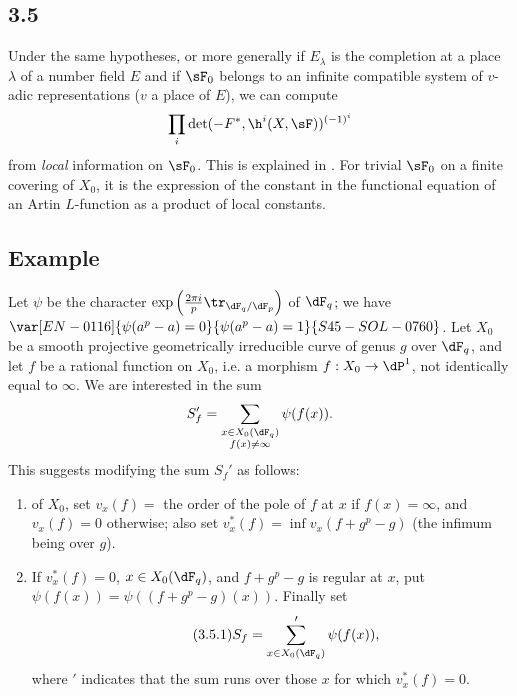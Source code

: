 \subsection*{3.5}\label{VI:3-5_} %

Under the same hypotheses, or more generally if $E_\lambda$ is the 
completion at a place $\lambda$ of a number field $E$ and if $\sF_0$ 
belongs to an infinite compatible system of $v$-adic representations 
($v$ a place of $E$), we can compute 
\[
  \prod_i \det(-F^\ast,\h^i(X,\sF))^{(-1)^i} 
\]
from \emph{local} information on $\sF_0$. This is explained in 
. For trivial $\sF_0$ on a finite covering of $X_0$, it is 
the expression of the constant in the functional equation of an Artin 
$L$-function as a product of local constants. 





\subsection{Example}\label{VI:3-5}

Let $\psi$ be the character 
$\exp\left(\frac{2\pi i}{p} \tr_{\dF_q/\dF_p}\right)$ of $\dF_q$; we have 
$\var[EN-0116]{\psi(a^p-a)=0}{\psi(a^p-a)=1}{S45-SOL-0760}$. Let $X_0$ be a smooth projective geometrically 
irreducible curve of genus $g$ over $\dF_q$, and let $f$ be a rational function on 
$X_0$, i.e. a morphism $f:X_0 \to \dP^1$, not identically equal to 
$\infty$. We are interested in the sum 
\[
  S_f' = \sum_{\substack{x\in X_0(\dF_q) \\ f(x)\ne \infty}} \psi(f(x)) 
  \text{.}
\]
 This suggests modifying 
the sum $S_f'$ as follows: 
\begin{enumerate}[\indent a)]
  \item {} of $X_0$, set $v_x(f) = $ the order of the 
    pole of $f$ at $x$ if $f(x)=\infty$, and $v_x(f)=0$ otherwise; also set 
    $v_x^\ast(f) = \inf v_x(f+g^p-g)$ (the infimum being over $g$). 
  \item If $v_x^\ast(f)=0$, $x\in X_0(\dF_q)$, and $f+g^p-g$ is 
    regular at $x$, put $\psi(f(x)) = \psi((f+g^p-g)(x))$. Finally set 
\begin{equation*}\tag{3.5.1}\label{VI:eq:3-5-1}
      S_f = \sum'_{x\in X_0(\dF_q)} \psi(f(x)) \text{,}
    \end{equation*}
    where $\prime$ indicates that the sum runs over those $x$ for which 
    $v_x^\ast(f)=0$. 
\end{enumerate}

